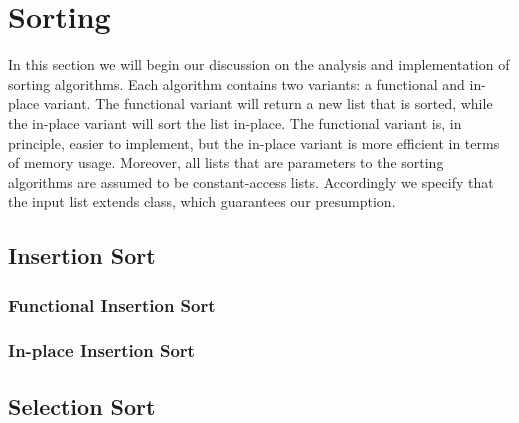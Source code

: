 \section{Sorting}
In this section we will begin our discussion on the analysis and implementation of sorting algorithms. Each algorithm contains two variants: a functional and in-place variant. The functional variant will return a new list that is sorted, while the in-place variant will sort the list in-place. The functional variant is, in principle, easier to implement, but the in-place variant is more efficient in terms of memory usage. Moreover, all lists that are parameters to the sorting algorithms are assumed to be constant-access lists. Accordingly we specify that the input list extends  class, which guarantees our presumption.
\subsection{Insertion Sort}
\subsubsection*{Functional Insertion Sort}
\subsubsection*{In-place Insertion Sort}

\subsection{Selection Sort}
